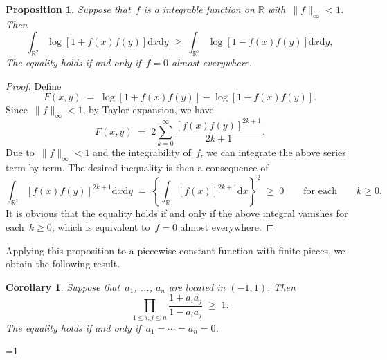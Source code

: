 \documentclass[12pt,a4paper]{article}  %
\newcommand{\bibfile}{\jobname.bib}  %
\newcommand{\iscite}{0}  %
\newtheorem{corollary}{Corollary}%
\newtheorem{proposition}{Proposition}%
\theoremstyle{definition}
\numberwithin{equation}{section}
\newcommand{\RR}{\mathbb{R}}
\newcommand{\md}{\mathrm{d}}
\begin{document}




\begin{proposition}
    \label{prop:int}
    Suppose that~$f$ is a integrable function on $\RR$ with~$\|f\|_\infty <1$. Then
    \begin{equation*}
        \int_{\RR^2} \log \left[ 1 + f(x)f(y) \right] \md x \md y
        \;\ge\; \int_{\RR^2} \log \left[ 1 - f(x)f(y) \right] \md x \md y,
    \end{equation*}
    The equality holds if and only if~$f = 0$ almost everywhere.
\end{proposition}

\begin{proof}
    Define
    \begin{equation*}
        F(x,y) \;=\; \log \left[ 1 + f(x)f(y) \right] - \log \left[ 1 - f(x)f(y) \right].
    \end{equation*}
    Since~$\|f\|_\infty < 1$,  by Taylor expansion, we have
    \begin{equation*}
        F(x,y) \;=\;  2\sum_{k=0}^\infty \frac{[f(x)f(y)]^{2k+1}}{2k+1}.
    \end{equation*}
    Due to~$\|f\|_\infty<1$ and the integrability of~$f$, we can integrate the above series term by term. The desired
    inequality is then a consequence of
    \begin{equation*}
        \int_{\RR^2}[f(x)f(y)]^{2k+1} \md x \md y \;=\; \left\{\int_{\RR}[f(x)]^{2k+1} \md x\right\}^2
        \;\ge\; 0
    \qquad\text{for each} \qquad k\ge 0.
    \end{equation*}
    It is obvious that the equality holds if and only if the above integral vanishes for each~$k \ge
    0$, which is equivalent to~$f=0$ almost everywhere.
\end{proof}

Applying this proposition to a piecewise constant function with finite pieces, we obtain the following result.

\begin{corollary}
    \label{coro:sum}
    Suppose that~$a_1$, ..., $a_n$ are located in $(-1, 1)$. Then
    \begin{equation*}
        \prod_{1\le i, j\le n} \frac{1+a_ia_j}{1-a_ia_j} \;\ge\;1.
    \end{equation*}
    The equality holds if and only if~$a_1 = \cdots = a_n = 0$.
\end{corollary}



\ifnum\iscite=1
    \small
    
    
\fi

\end{document}
